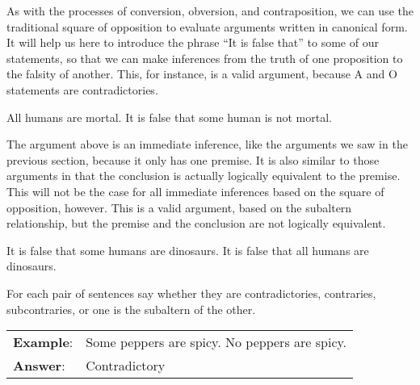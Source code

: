 As with the processes of conversion, obversion, and contraposition, we can use the traditional square of opposition to evaluate arguments written in canonical form. It will help us here to introduce the phrase ``It is false that'' to some of our statements, so that we can make inferences from the truth of one proposition to the falsity of another. This, for instance, is a valid argument, because A and O statements are contradictories.


\begin{earg*}
\item All humans are mortal.
\itemc[.45] It is false that some human is not mortal. 
\end{earg*} 

The argument above is an immediate inference, like the arguments we saw in the previous section, because it only has one premise. It is also similar to those arguments in that the conclusion is actually logically equivalent to the premise. This will not be the case for all immediate inferences based on the square of opposition, however. This is a valid argument, based on the subaltern relationship, but the premise and the conclusion are not logically equivalent. 

\begin{earg*}
\item It is false that some humans are dinosaurs.
\itemc[.45]  It is false that all humans are dinosaurs.
\end{earg*}


\practiceproblems
\noindent \problempart For each pair of sentences say whether they are contradictories, contraries, subcontraries, or one is the subaltern of the other. 

\begin{longtabu}{p{.1\linewidth}p{.9\linewidth}}
\textbf{Example}: & Some peppers are spicy. \newline No peppers are spicy. \\
\textbf{Answer}: &Contradictory\\
\end{longtabu}

